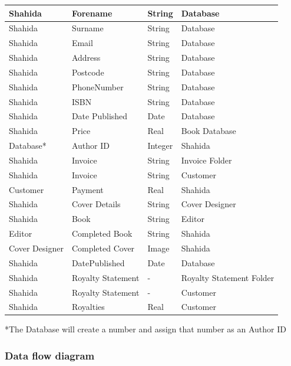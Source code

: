 \begin{center}
\begin{tabular}{|p{3cm}|p{3.5cm}|p{3cm}|p{2.5cm}|}
    Shahida & Forename & String & Database  \\ \hline
    Shahida & Surname & String & Database  \\ \hline
    Shahida & Email & String & Database  \\ \hline
    Shahida & Address & String & Database  \\ \hline
    Shahida & Postcode & String & Database  \\ \hline
    Shahida & PhoneNumber & String & Database  \\ \hline
    Shahida & ISBN & String & Database \\ \hline
    Shahida & Date Published & Date & Database \\ \hline
    Shahida & Price & Real & Book Database \\ \hline
    Database* & Author ID & Integer & Shahida  \\ \hline
    Shahida & Invoice & String & Invoice Folder \\ \hline 
    Shahida & Invoice & String & Customer  \\ \hline
    Customer & Payment & Real & Shahida  \\ \hline
    Shahida & Cover Details & String & Cover Designer\\ \hline
    Shahida & Book & String & Editor  \\ \hline
    Editor & Completed Book & String & Shahida  \\ \hline
    Cover Designer & Completed Cover & Image & Shahida \\ \hline
    Shahida & DatePublished & Date & Database \\ \hline 
    Shahida & Royalty Statement & - & Royalty Statement Folder \\ \hline
    Shahida & Royalty Statement & - & Customer \\ \hline
    Shahida & Royalties & Real & Customer \\ \hline 
	
    \hline
\end{tabular}
\end{center}
*The Database will create a number and assign that number as an Author ID

\subsubsection{Data flow diagram}

